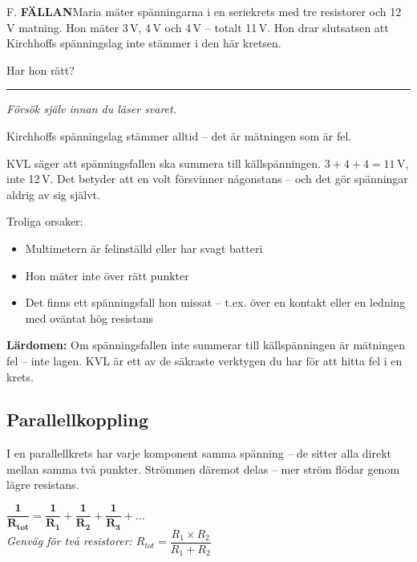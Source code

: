 \documentclass[a4paper,11pt,twoside]{book}
\newcommand{\qfallan}{\colorbox{ljusbrun}{\textcolor{kakao}{\headingfont\bfseries\tiny FÄLLAN}}}
\begin{document}
\begin{qblock}{F.}
\qfallan\quad Maria mäter spänningarna i en seriekrets 
med tre resistorer och 12\,V matning. Hon mäter 
3\,V, 4\,V och 4\,V -- totalt 11\,V. Hon drar 
slutsatsen att Kirchhoffs spänningslag inte stämmer 
i den här kretsen.

Har hon rätt?
\end{qblock}

\medskip
\noindent\rule{\textwidth}{0.4pt}
{\small\itshape Försök själv innan du läser svaret.}
\medskip

\begin{worked}[title={Lösning -- Fallgropsfråga 1.6.1\,F}]
Kirchhoffs spänningslag stämmer alltid -- det är 
mätningen som är fel.

KVL säger att spänningsfallen ska summera till 
källspänningen. $3 + 4 + 4 = 11\,\text{V}$, inte 
12\,V. Det betyder att en volt försvinner någonstans 
-- och det gör spänningar aldrig av sig självt.

Troliga orsaker:
\begin{itemize}
  \item Multimetern är felinställd eller har svagt 
        batteri
  \item Hon mäter inte över rätt punkter
  \item Det finns ett spänningsfall hon missat -- 
        t.ex. över en kontakt eller en ledning med 
        oväntat hög resistans
\end{itemize}

\textbf{Lärdomen:} Om spänningsfallen inte summerar 
till källspänningen är mätningen fel -- inte lagen. 
KVL är ett av de säkraste verktygen du har för att 
hitta fel i en krets.
\end{worked}

\subsection{Parallellkoppling}

I en parallellkrets har varje komponent samma spänning 
-- de sitter alla direkt mellan samma två punkter. 
Strömmen däremot delas -- mer ström flödar genom 
lägre resistans.

\begin{formulabox}
{\large$\mathbf{\dfrac{1}{R_{tot}} = \dfrac{1}{R_1} + \dfrac{1}{R_2} + \dfrac{1}{R_3} + \ldots}$}\\[4mm]
{\small\normalfont\itshape Genväg för två resistorer: $R_{tot} = \dfrac{R_1 \times R_2}{R_1 + R_2}$}
\end{formulabox}
\end{document}
